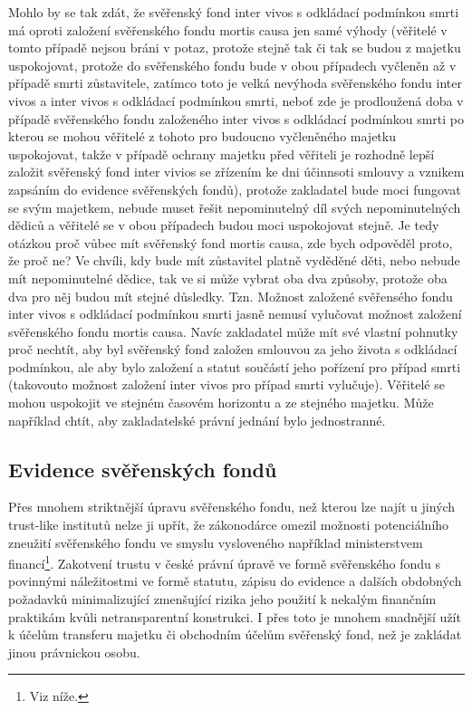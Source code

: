\documentclass{article}
\begin{document}
Mohlo by se tak zdát, že svěřenský fond inter vivos s odkládací podmínkou smrti má oproti založení svěřenského fondu mortis causa jen samé výhody (věřitelé v tomto případě nejsou bráni v potaz, protože stejně tak či tak se budou z majetku uspokojovat, protože do svěřenského fondu bude v obou případech vyčleněn až v případě smrti zůstavitele, zatímco toto je velká nevýhoda svěřenského fondu inter vivos a inter vivos s odkládací podmínkou smrti, neboť zde je prodloužená doba v případě svěřenského fondu založeného inter vivos s odkládací podmínkou smrti po kterou se mohou věřitelé z tohoto pro budoucno vyčleněného majetku uspokojovat, takže v případě ochrany majetku před věřiteli je rozhodně lepší založit svěřenský fond inter vivios se zřízením ke dni účinnsoti smlouvy a vznikem zapsáním do evidence svěřenských fondů), protože zakladatel bude moci fungovat se svým majetkem, nebude muset řešit nepominutelný díl svých nepominutelných dědiců a věřitelé se v obou případech budou moci uspokojovat stejně. Je tedy otázkou proč vůbec mít svěřenský fond mortis causa, zde bych odpověděl proto, že proč ne? Ve chvíli, kdy bude mít zůstavitel platně vyděděné děti, nebo nebude mít nepominutelné dědice, tak ve si může vybrat oba dva způsoby, protože oba dva pro něj budou mít stejné důsledky. Tzn. Možnost založené svěřensého fondu inter vivos s odkládací podmínkou smrti jasně nemusí vylučovat možnost založení svěřenského fondu mortis causa. Navíc zakladatel může mít své vlastní pohnutky proč nechtít, aby byl svěřenský fond založen smlouvou za jeho života s odkládací podmínkou, ale aby bylo založení a statut součástí jeho pořízení pro případ smrti (takovouto možnost založení inter vivos pro případ smrti vylučuje). Věřitelé se mohou uspokojit ve stejném časovém horizontu a ze stejného majetku. Může například chtít, aby zakladatelské právní jednání bylo jednostranné.
 

\subsection{Evidence svěřenských fondů}

Přes mnohem striktnější úpravu svěřenského fondu, než kterou lze najít u jiných trust-like institutů nelze ji upřít, že zákonodárce omezil možnosti potenciálního zneužití svěřenského fondu ve smyslu vysloveného například ministerstvem financí\footnote{Viz níže.}. Zakotvení trustu v české právní úpravě ve formě svěřenského fondu s povinnými náležitostmi ve formě statutu, zápisu do evidence a dalších obdobných požadavků minimalizující zmenšující rizika jeho použití k nekalým finančním praktikám kvůli netransparentní konstrukci. I přes toto je mnohem snadnější užít k účelům transferu majetku či obchodním účelům svěřenský fond, než je zakládat jinou právnickou osobu.\\
\end{document}
